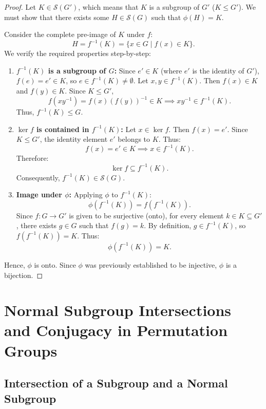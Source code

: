 \documentclass[12pt]{article}
\theoremstyle{definition}
\theoremstyle{plain}
\begin{document}
\begin{proof}
Let $K \in \mathcal{S}(G')$, which means that $K$ is a subgroup of $G'$ ($K \le G'$).
We must show that there exists some $H \in \mathcal{S}(G)$ such that $\phi(H) = K$.

Consider the complete pre-image of $K$ under $f$:
\[
H = f^{-1}(K) = \{ x \in G \mid f(x) \in K \}.
\]
We verify the required properties step-by-step:
\begin{enumerate}
    \item \textbf{$f^{-1}(K)$ is a subgroup of $G$:}
    Since $e' \in K$ (where $e'$ is the identity of $G'$), $f(e) = e' \in K$, so $e \in f^{-1}(K) \neq \emptyset$.
    Let $x, y \in f^{-1}(K)$. Then $f(x) \in K$ and $f(y) \in K$. Since $K \le G'$,
    \[
    f(x y^{-1}) = f(x) (f(y))^{-1} \in K \implies x y^{-1} \in f^{-1}(K).
    \]
    Thus, $f^{-1}(K) \le G$.
    
    \item \textbf{$\ker f$ is contained in $f^{-1}(K)$:}
    Let $x \in \ker f$. Then $f(x) = e'$.
    Since $K \le G'$, the identity element $e'$ belongs to $K$.
    Thus:
    \[
    f(x) = e' \in K \implies x \in f^{-1}(K).
    \]
    Therefore:
    \[
    \ker f \subseteq f^{-1}(K).
    \]
    Consequently, $f^{-1}(K) \in \mathcal{S}(G)$.
    
    \item \textbf{Image under $\phi$:}
    Applying $\phi$ to $f^{-1}(K)$:
    \[
    \phi(f^{-1}(K)) = f(f^{-1}(K)).
    \]
    Since $f: G \to G'$ is given to be surjective (onto), for every element $k \in K \subseteq G'$, there exists $g \in G$ such that $f(g) = k$. By definition, $g \in f^{-1}(K)$, so $f(f^{-1}(K)) = K$.
    Thus:
    \[
    \phi(f^{-1}(K)) = K.
    \]
\end{enumerate}
Hence, $\phi$ is onto. Since $\phi$ was previously established to be injective, $\phi$ is a bijection.
\end{proof}



\section{Normal Subgroup Intersections and Conjugacy in Permutation Groups}

\subsection{Intersection of a Subgroup and a Normal Subgroup}
\end{document}

